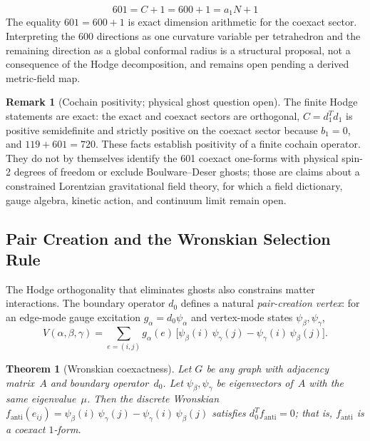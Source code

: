 \documentclass[12pt,a4paper]{article}
\newtheorem{theorem}{Theorem}
\theoremstyle{definition}
\newtheorem{remark}{Remark}
\begin{document}
\begin{equation}
\boxed{601 = C + 1 = 600 + 1 = a_1 N + 1}
\end{equation}
The equality $601=600+1$ is exact dimension arithmetic for the coexact sector.  Interpreting the 600 directions as one curvature variable per tetrahedron and the remaining direction as a global conformal radius is a structural proposal, not a consequence of the Hodge decomposition, and remains open pending a derived metric-field map.

\begin{remark}[Cochain positivity; physical ghost question open]
The finite Hodge statements are exact: the exact and coexact sectors are orthogonal, $C=d_1^T d_1$ is positive semidefinite and strictly positive on the coexact sector because $b_1=0$, and $119+601=720$.  These facts establish positivity of a finite cochain operator.  They do not by themselves identify the 601 coexact one-forms with physical spin-2 degrees of freedom or exclude Boulware--Deser ghosts; those are claims about a constrained Lorentzian gravitational field theory, for which a field dictionary, gauge algebra, kinetic action, and continuum limit remain open.
\end{remark}

\subsection{Pair Creation and the Wronskian Selection Rule}
\label{sec:pair_creation}

The Hodge orthogonality that eliminates ghosts also constrains matter interactions.
The boundary operator $d_0$ defines a natural
\emph{pair-creation vertex}: for an edge-mode gauge excitation
$g_\alpha = d_0 \psi_\alpha$ and vertex-mode states $\psi_\beta, \psi_\gamma$,
\begin{equation}
V(\alpha,\beta,\gamma) = \sum_{e=(i,j)} g_\alpha(e)\,\bigl[\psi_\beta(i)\,\psi_\gamma(j)
- \psi_\gamma(i)\,\psi_\beta(j)\bigr].
\label{eq:pair_vertex}
\end{equation}

\begin{theorem}[Wronskian coexactness]\label{thm:wronskian}
Let $G$ be any graph with adjacency matrix~$A$ and boundary operator~$d_0$.
Let $\psi_\beta, \psi_\gamma$ be eigenvectors of~$A$ with
the \emph{same} eigenvalue~$\mu$. Then the discrete Wronskian
$f_{\mathrm{anti}}(e_{ij}) = \psi_\beta(i)\,\psi_\gamma(j) - \psi_\gamma(i)\,\psi_\beta(j)$
satisfies $d_0^T\! f_{\mathrm{anti}} = 0$; that is, $f_{\mathrm{anti}}$ is a
coexact $1$-form.
\end{theorem}
\end{document}

